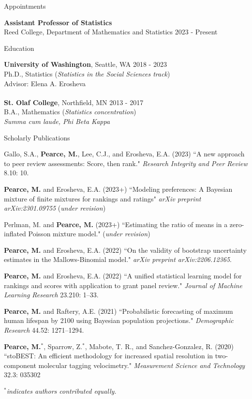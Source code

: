 \documentclass{resume} %
\begin{document}

\begin{rSection}{Appointments}

{\bf Assistant Professor of Statistics}
\\ Reed College, Department of Mathematics and Statistics \hfill{2023 - Present}
\end{rSection}

\begin{rSection}{Education}

{\bf University of Washington}, Seattle, WA \hfill {2018 - 2023} 
\\ Ph.D., Statistics ({\it Statistics in the Social Sciences track})
\\ Advisor: Elena A. Erosheva
\\
\\{\bf St. Olaf College}, Northfield, MN \hfill {2013 - 2017} 
\\ B.A., Mathematics ({\it Statistics concentration})
\\ {\it Summa cum laude, Phi Beta Kappa}
\end{rSection}


\begin{rSection}{Scholarly Publications}

Gallo, S.A., {\bf Pearce, M.}, Lee, C.J., and Erosheva, E.A. (2023) ``A new approach to peer review assessments: Score, then rank." \textit{Research Integrity and Peer Review} 8.10: 10.

{\bf Pearce, M.} and Erosheva, E.A. (2023+) ``Modeling preferences: A Bayesian mixture of finite mixtures for rankings and ratings" \textit{arXiv preprint arXiv:2301.09755} (\textit{under revision})

Perlman, M. and {\bf Pearce, M.} (2023+) ``Estimating the ratio of means in a zero-inflated Poisson mixture model." (\textit{under revision})

{\bf Pearce, M.} and Erosheva, E.A. (2022) ``On the validity of bootstrap uncertainty estimates in the Mallows-Binomial model." \textit{arXiv preprint arXiv:2206.12365}.

{\bf Pearce, M.} and Erosheva, E.A. (2022) ``A unified statistical learning model for rankings and scores with application to grant panel review." \textit{Journal of Machine Learning Research} 23.210: 1--33.

{\bf Pearce, M.} and Raftery, A.E. (2021) ``Probabilistic forecasting of maximum human lifespan by 2100 using Bayesian population projections." {\em Demographic Research} 44.52: 1271--1294.

{\bf Pearce, M.}$^*$, Sparrow, Z.$^*$, Mabote, T. R., and Sanchez-Gonzalez, R. (2020) ``stoBEST: An efficient methodology for increased spatial resolution in two-component molecular tagging velocimetry." {\em Measurement Science and Technology} 32.3: 035302

{\em $^*$indicates authors contributed equally.}
\end{rSection}
\end{document}

